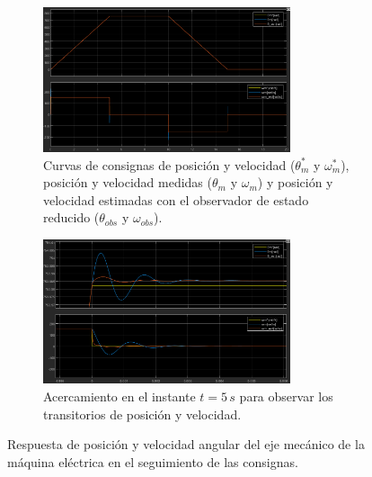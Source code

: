 \documentclass{article}
\begin{document}
\begin{figure}[H]
    \centering
    \begin{subfigure}[t]{\textwidth}
        \centering
        \includegraphics[width=0.8\textwidth]{Imagenes/PosicionVelocidadSimulacionModeloCompleto.png}
        \caption{Curvas de consignas de posición y velocidad (\(\theta^*_m\) y \(\omega^*_m\)), posición y velocidad  medidas (\(\theta_m\) y \(\omega_m\))  y posición y velocidad estimadas con el observador de estado reducido (\(\theta_{obs}\) y \(\omega_{obs}\)).}
        \label{fig:PosicionVelocidadSimulacionModeloCompleto}
    \end{subfigure}
    
    \vspace{0.5cm} %
    
    \begin{subfigure}[t]{\textwidth}
        \centering
        \includegraphics[width=0.8\textwidth]{Imagenes/AcercamientoRespuestaSimulacionCompleta.png}
        \caption{Acercamiento en el instante \(t = 5\,s\) para observar los transitorios de posición y velocidad.}
        \label{fig:AcercamientoRespuestaSimulacionCompleta}
    \end{subfigure}
    \caption{Respuesta de posición y velocidad angular del eje mecánico de la máquina eléctrica en el seguimiento de las consignas.}
    \label{fig:RespuestaPosicionVelocidadSimulacionCompleta}
\end{figure}
\end{document}
